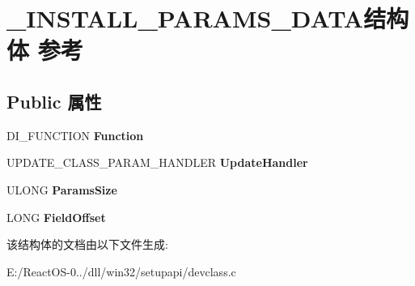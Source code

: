 \hypertarget{struct___i_n_s_t_a_l_l___p_a_r_a_m_s___d_a_t_a}{}\section{\+\_\+\+I\+N\+S\+T\+A\+L\+L\+\_\+\+P\+A\+R\+A\+M\+S\+\_\+\+D\+A\+T\+A结构体 参考}
\label{struct___i_n_s_t_a_l_l___p_a_r_a_m_s___d_a_t_a}
\subsection*{Public 属性}
\begin{DoxyCompactItemize}
\item 
\mbox{\label{struct___i_n_s_t_a_l_l___p_a_r_a_m_s___d_a_t_a_ac84f32302abd2543ec5dea45e6667d1e}} 
D\+I\+\_\+\+F\+U\+N\+C\+T\+I\+ON {\bfseries Function}
\item 
\mbox{\label{struct___i_n_s_t_a_l_l___p_a_r_a_m_s___d_a_t_a_ac69dd598f9e7a30ceefbe167cd0824bb}} 
U\+P\+D\+A\+T\+E\+\_\+\+C\+L\+A\+S\+S\+\_\+\+P\+A\+R\+A\+M\+\_\+\+H\+A\+N\+D\+L\+ER {\bfseries Update\+Handler}
\item 
\mbox{\label{struct___i_n_s_t_a_l_l___p_a_r_a_m_s___d_a_t_a_a1c16d09f87519031bc67ec3c5bd60682}} 
U\+L\+O\+NG {\bfseries Params\+Size}
\item 
\mbox{\label{struct___i_n_s_t_a_l_l___p_a_r_a_m_s___d_a_t_a_ae88e6dea5812d91dafabeaae6b7b15df}} 
L\+O\+NG {\bfseries Field\+Offset}
\end{DoxyCompactItemize}


该结构体的文档由以下文件生成\+:\begin{DoxyCompactItemize}
\item 
E\+:/\+React\+O\+S-\/0../dll/win32/setupapi/devclass.\+c\end{DoxyCompactItemize}
